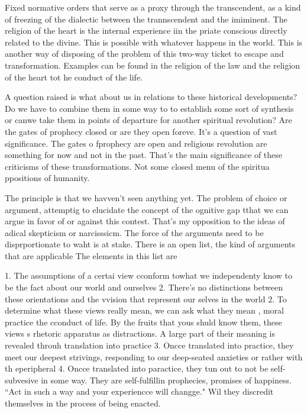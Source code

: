 \documentclass[12pt,letterpaper]{article}
\begin{document}
Fixed normative orders that serve as a proxy through the transcendent, as a kind of freezing of the dialectic between the trannscendent and the imiminent.  The religion of the heart is the internal experience iin the priate conscious directly related to the divine.  This is possible with whatever happens in the world.  This is another way of disposing of the problem of this two-way ticket to escape and transformation.  Examples can be found in the religion of the law and the religion of the heart tot he conduct of the life. 

A question raised is what about us in relations to these historical developments?  Do we have to combine them in some way to to establish some sort of synthesis or canwe take them in points of departure for another spiritual revolution?  Are the gates of prophecy closed or are they open foreve.  It's a question of vast significance.  The gates o fprophecy are open and religious revolution are something for now and not in the past.  That's the main significance of these criticisms of these transformations.  Not some closed menu of the spiritua ppositions of humanity.  

The principle is that we havven't seen anything yet.  The problem of choice or argument, attemptig to elucidate the concept of the ognitive gap tthat we can argue in favor of or against this contest.  That's my opposition to the ideas of adical skepticism or narcisssicm.  The force of the arguments need to be disprportionate to waht is at stake.  There is an open list, the kind of arguments that are applicable  The elements in this list are 

1. The assumptions of a certai view cconform towhat we independenty know to be the fact about our world and ourselves
2. There's no distinctions between these orientations and the vvision that represent our selves in the world
2. To determine what these views really mean, we can ask what they mean , moral practice the cconduct of life.  By the fruits that yous  shuld know them, these views s rhetoric apparatus as distractions.  A large part of their meaning is revealed throuh translation into practice
3. Oncce translated into practice, they meet our deepest strivings, responding to our deep-seated anxieties or rather with th eperipheral
4. Oncce translated into paractice, they tun out to not be self-subvesive in some way.  They are self-fulfillin prophecies, promises of happiness.  ``Act in such a way and your experiencce will changge."  Wil they discredit themselves in the process of being enacted.
\end{document}
